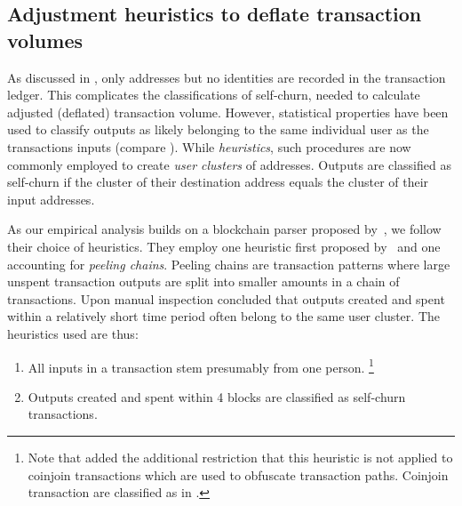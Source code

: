 \subsection{Adjustment heuristics to deflate transaction volumes}
\label{sec:particularities_txvol:adjustment_txvol}%
%
As discussed in , only addresses but no identities are
recorded in the transaction ledger. %
This complicates the classifications of self-churn, needed to calculate
adjusted (deflated) transaction volume. %
However, statistical properties have been used to classify outputs as likely
belonging to the same individual user as the transactions inputs (compare
\cite{meiklejohn2013fistful}). %
While \emph{heuristics}, such procedures are now commonly employed to create
\emph{user clusters} of addresses. %
Outputs are classified as self-churn if the cluster of their destination
address equals the cluster of their input addresses. %


As our empirical analysis builds on a blockchain parser proposed
by~\cite{kalodner2017blocksci}, we follow their choice of heuristics. %
They employ one heuristic first proposed by~\cite{meiklejohn2013fistful} and
one accounting for \textit{peeling chains}. %
Peeling chains are transaction patterns where large unspent transaction
outputs are split into smaller amounts in a chain of transactions. %
Upon manual inspection \cite{kalodner2017blocksci} concluded that outputs
created and spent within a relatively short time period often belong to the
same user cluster. %
The heuristics used are thus:%
\begin{enumerate}\setlength{\itemsep}{0pt}
\item All inputs in a transaction stem presumably from one person.
  \footnote{%
    Note that \cite{kalodner2017blocksci} added the additional restriction
    that this heuristic is not applied to coinjoin transactions which are
    used to obfuscate transaction paths. %
    Coinjoin transaction are classified as in \cite{goldfeder2018cookie}.%
  } %
\item Outputs created and spent within 4 blocks are classified as self-churn
  transactions. %
\end{enumerate}%

